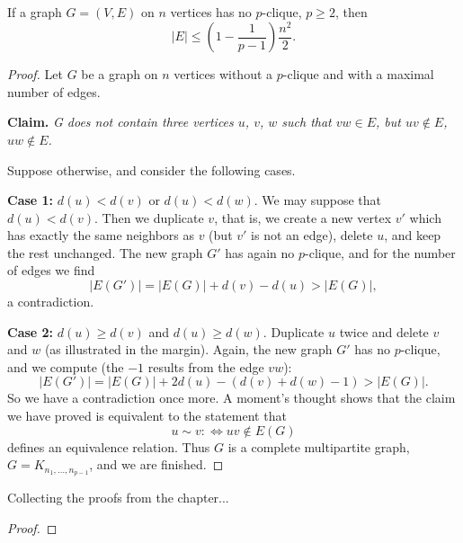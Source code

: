 \begin{theorem}
  \label{ch41proof5}
If a graph $G = (V, E)$ on $n$ vertices has no $p$-clique, $p \geq 2$, then
\[
|E| \leq \left(1 - \frac{1}{p - 1}\right) \frac{n^2}{2}. \tag{1}
\]
\end{theorem}
\begin{proof}
Let $G$ be a graph on $n$ vertices without a $p$-clique and with a maximal number of edges.

\textbf{Claim.} \textit{G does not contain three vertices $u$, $v$, $w$ such that $vw \in E$, but $uv \notin E$, $uw \notin E$.}

Suppose otherwise, and consider the following cases.

\textbf{Case 1:} $d(u) < d(v)$ or $d(u) < d(w)$.
We may suppose that $d(u) < d(v)$. Then we duplicate $v$, that is, we create a new vertex $v'$
which has exactly the same neighbors as $v$ (but $v'$ is not an edge), delete $u$, and keep the rest unchanged.
The new graph $G'$ has again no $p$-clique, and for the number of edges we find
\[
|E(G')| = |E(G)| + d(v) - d(u) > |E(G)|,
\]
a contradiction.

\textbf{Case 2:} $d(u) \geq d(v)$ and $d(u) \geq d(w)$.
Duplicate $u$ twice and delete $v$ and $w$ (as illustrated in the margin).
Again, the new graph $G'$ has no $p$-clique, and we compute (the $-1$ results from the edge $vw$):
\[
|E(G')| = |E(G)| + 2d(u) - (d(v) + d(w) - 1) > |E(G)|.
\]
So we have a contradiction once more.
A moment’s thought shows that the claim we have proved is equivalent to the statement that
\[
u \sim v : \iff uv \notin E(G)
\]
defines an equivalence relation. Thus $G$ is a complete multipartite graph, $G = K_{n_1, \dots, n_{p-1}}$,
and we are finished.
\end{proof}

\begin{theorem}
  \label{turan_graph}
  Collecting the proofs from the chapter...
\end{theorem}
\begin{proof}
\end{proof}

